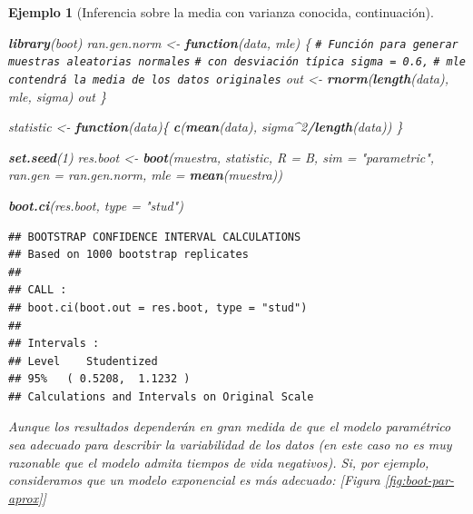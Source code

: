 \documentclass[
]{book}
\newenvironment{Shaded}{\begin{snugshade}}{\end{snugshade}}
\newcommand{\AttributeTok}[1]{\textcolor[rgb]{0.13,0.29,0.53}{#1}}
\newcommand{\CommentTok}[1]{\textcolor[rgb]{0.56,0.35,0.01}{\textit{#1}}}
\newcommand{\ControlFlowTok}[1]{\textcolor[rgb]{0.13,0.29,0.53}{\textbf{#1}}}
\newcommand{\DecValTok}[1]{\textcolor[rgb]{0.00,0.00,0.81}{#1}}
\newcommand{\FunctionTok}[1]{\textcolor[rgb]{0.13,0.29,0.53}{\textbf{#1}}}
\newcommand{\NormalTok}[1]{#1}
\newcommand{\OtherTok}[1]{\textcolor[rgb]{0.56,0.35,0.01}{#1}}
\newcommand{\SpecialCharTok}[1]{\textcolor[rgb]{0.81,0.36,0.00}{\textbf{#1}}}
\newcommand{\StringTok}[1]{\textcolor[rgb]{0.31,0.60,0.02}{#1}}
\theoremstyle{break}
\newtheorem{example}{Ejemplo}[chapter]
\theoremstyle{nonumberplain}
\renewcommand{\CommentTok}[1]{\textcolor[rgb]{0.41,0.41,0.41}{\texttt{#1}}}
\begin{document}
\begin{example}[Inferencia sobre la media con varianza conocida, continuación]
\begin{Shaded}
\begin{Highlighting}[]
\FunctionTok{library}\NormalTok{(boot)}
\NormalTok{ran.gen.norm }\OtherTok{\textless{}{-}} \ControlFlowTok{function}\NormalTok{(data, mle) \{}
    \CommentTok{\# Función para generar muestras aleatorias normales}
    \CommentTok{\# con desviación típica sigma = 0.6,}
    \CommentTok{\# mle contendrá la media de los datos originales}
\NormalTok{    out }\OtherTok{\textless{}{-}} \FunctionTok{rnorm}\NormalTok{(}\FunctionTok{length}\NormalTok{(data), mle, sigma)}
\NormalTok{    out}
\NormalTok{\}}

\NormalTok{statistic }\OtherTok{\textless{}{-}} \ControlFlowTok{function}\NormalTok{(data)\{}
    \FunctionTok{c}\NormalTok{(}\FunctionTok{mean}\NormalTok{(data), sigma}\SpecialCharTok{\^{}}\DecValTok{2}\SpecialCharTok{/}\FunctionTok{length}\NormalTok{(data))}
\NormalTok{\}}

\FunctionTok{set.seed}\NormalTok{(}\DecValTok{1}\NormalTok{)}
\NormalTok{res.boot }\OtherTok{\textless{}{-}} \FunctionTok{boot}\NormalTok{(muestra, statistic, }\AttributeTok{R =}\NormalTok{ B, }\AttributeTok{sim =} \StringTok{"parametric"}\NormalTok{,}
                 \AttributeTok{ran.gen =}\NormalTok{ ran.gen.norm, }\AttributeTok{mle =} \FunctionTok{mean}\NormalTok{(muestra))}

\FunctionTok{boot.ci}\NormalTok{(res.boot, }\AttributeTok{type =} \StringTok{"stud"}\NormalTok{)}
\end{Highlighting}
\end{Shaded}

\begin{verbatim}
## BOOTSTRAP CONFIDENCE INTERVAL CALCULATIONS
## Based on 1000 bootstrap replicates
## 
## CALL : 
## boot.ci(boot.out = res.boot, type = "stud")
## 
## Intervals : 
## Level    Studentized     
## 95%   ( 0.5208,  1.1232 )  
## Calculations and Intervals on Original Scale
\end{verbatim}

Aunque los resultados dependerán en gran medida de que el modelo paramétrico
sea adecuado para describir la variabilidad de los datos
(en este caso no es muy razonable que el modelo admita tiempos de vida negativos).
Si, por ejemplo, consideramos que un modelo exponencial es más adecuado: {[}Figura \ref{fig:boot-par-aprox}{]}


\end{example}
\end{document}
